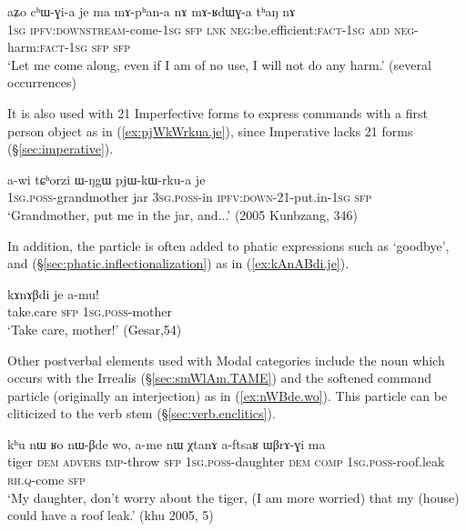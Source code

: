 \begin{exe}
\ex \label{ex:chWGia.je}
\gll  aʑo cʰɯ-ɣi-a je ma mɤ-pʰan-a nɤ mɤ-ʁdɯɣ-a tʰaŋ nɤ \\
\textsc{1sg} \textsc{ipfv}:\textsc{downstream}-come-\textsc{1sg} \textsc{sfp} \textsc{lnk} \textsc{neg}:be.efficient:\textsc{fact}-\textsc{1sg} \textsc{add} \textsc{neg}-harm:\textsc{fact}-\textsc{1sg} \textsc{sfp} \textsc{sfp} \\
\glt `Let me come along, even if I am of no use, I will not do any harm.' (several occurrences)
\end{exe}

It is also used with 2\fl{}1 Imperfective forms to express  commands with a first person object as in (\ref{ex:pjWkWrkua.je}), since Imperative lacks 2\fl{}1 forms (§\ref{sec:imperative}).

\begin{exe}
\ex \label{ex:pjWkWrkua.je}
\gll a-wi tɕʰorzi ɯ-ŋgɯ pjɯ-kɯ-rku-a je\\
\textsc{1sg}.\textsc{poss}-grandmother jar \textsc{3sg}.\textsc{poss}-in \textsc{ipfv}:\textsc{down}-2\fl{}1-put.in-\textsc{1sg} \textsc{sfp}\\
\glt `Grandmother, put me in the jar, and...' (2005 Kunbzang, 346)
\end{exe}

In addition, the particle  is often added to phatic expressions such as  `goodbye',  and  (§\ref{sec:phatic.inflectionalization}) as in (\ref{ex:kAnABdi.je}).


\begin{exe}
\ex \label{ex:kAnABdi.je}
\gll kɤnɤβdi je a-mu! \\
take.care \textsc{sfp} \textsc{1sg}.\textsc{poss}-mother \\
\glt `Take care, mother!' (Gesar,54)
\end{exe}

Other postverbal elements used with Modal categories include the noun  which occurs with the Irrealis (§\ref{sec:smWlAm.TAME}) and the softened command particle  (originally an interjection) as in (\ref{ex:nWBde.wo}). This particle can be cliticized to the verb stem (§\ref{sec:verb.enclitics}).

\begin{exe}
\ex \label{ex:nWBde.wo}
\gll  kʰu nɯ ʁo nɯ-βde wo, a-me nɯ χtanɤ a-ftsaʁ ɯβrɤ-ɣi ma \\
tiger \textsc{dem} \textsc{advers} \textsc{imp}-throw \textsc{sfp} \textsc{1sg}.\textsc{poss}-daughter \textsc{dem} \textsc{comp} \textsc{1sg}.\textsc{poss}-roof.leak \textsc{rh}.\textsc{q}-come \textsc{sfp} \\
\glt `My daughter, don't worry about the tiger, (I am more worried) that my (house) could have a roof leak.' (khu 2005, 5)
\end{exe}

